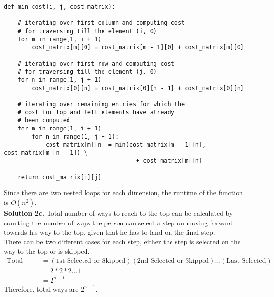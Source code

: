 \documentclass[11pt]{article}
\begin{document}
\begin{lstlisting}[basicstyle=\small]
def min_cost(i, j, cost_matrix):

    # iterating over first column and computing cost
    # for traversing till the element (i, 0)
    for m in range(1, i + 1):
        cost_matrix[m][0] = cost_matrix[m - 1][0] + cost_matrix[m][0]

    # iterating over first row and computing cost
    # for traversing till the element (j, 0)
    for n in range(1, j + 1):
        cost_matrix[0][n] = cost_matrix[0][n - 1] + cost_matrix[0][n]

    # iterating over remaining entries for which the
    # cost for top and left elements have already
    # been computed
    for m in range(1, i + 1):
        for n in range(1, j + 1):
            cost_matrix[m][n] = min(cost_matrix[m - 1][n], cost_matrix[m][n - 1]) \
                                      + cost_matrix[m][n]

    return cost_matrix[i][j]
\end{lstlisting}
Since there are two nested loops for each dimension, the runtime of the function is $O(n^2)$.\\
\linebreak
\textbf{Solution 2c.} Total number of ways to reach to the top can be calculated by counting the number of ways the person can select a step on moving forward towards his way to the top, given that he has to land on the final step. \\
\linebreak
There can be two different cases for each step, either the step is selected on the way to the top or is skipped. \\
\begin{align*}
\text{Total ways} & = (\text{1st Selected or Skipped}) (\text{2nd Selected or Skipped}) \dots (\text{Last Selected}) \\ 
&= 2 * 2 * 2 \dots 1 \\
& = 2^{n-1}
\end{align*}
Therefore, total ways are $2^{n-1}$.
\end{document}
